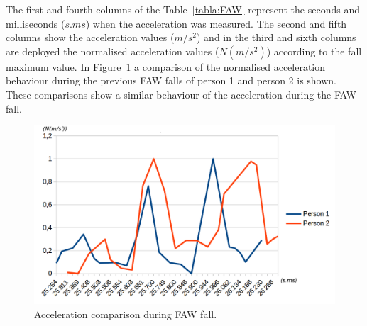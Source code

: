 \documentclass[review]{elsarticle}
\begin{document}
The first and fourth columns of the Table~\ref{tabla:FAW} represent the seconds and milliseconds 
($s.ms$) when the acceleration was measured. The second and fifth columns show the acceleration 
values ($m/s^2$) and in the third and sixth columns are deployed the normalised acceleration values 
($N(m/s^2)$) according to the fall maximum value. In Figure~\ref{fig:FAWcomparison} a comparison 
of the normalised acceleration behaviour during the previous FAW falls of person 1 and person 2 is 
shown. These comparisons show a similar behaviour of the acceleration during the FAW fall.

\begin{figure}[!ht]
  \centering
  \includegraphics[scale=0.2]{img/TwoFallsComparative.png}
  \caption[Acceleration during FAW fall]{Acceleration comparison during FAW fall.}
  \label{fig:FAWcomparison}
\end{figure}
\end{document}
